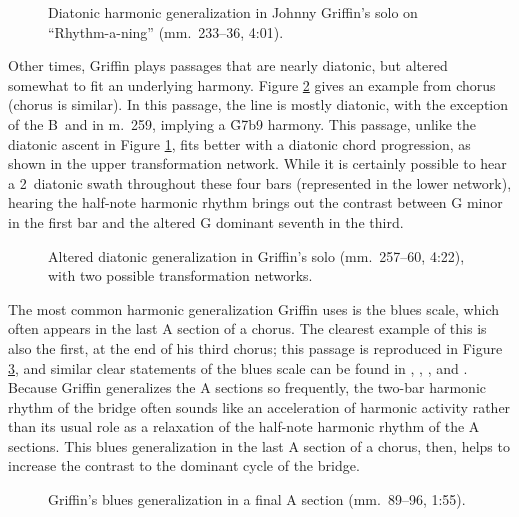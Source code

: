 \begin{figure}[tbp]
  \caption[Diatonic harmonic generalization in Johnny Griffin's solo on
    ``Rhythm-a-ning.'']{Diatonic harmonic generalization in Johnny Griffin's
    solo on ``Rhythm-a-ning'' (mm.~233--36, 4:01).}
  \label{ran:jg-diatonic-gen}
\end{figure}

Other times, Griffin plays passages that are nearly diatonic, but altered
somewhat to fit an underlying harmony. Figure \ref{ran:jg-diatonic-alt} gives
an example from chorus  (chorus  is similar). In this
passage, the line is mostly diatonic, with the exception of the B\nat\ and
\Aflat in m.~259, implying a \h{G7b9} harmony. This passage, unlike the
diatonic ascent in Figure \ref{ran:jg-diatonic-gen}, fits better with a
diatonic chord progression, as shown in the upper transformation network.
While it is certainly possible to hear a 2\flat\ diatonic swath throughout
these four bars (represented in the lower network), hearing the half-note harmonic rhythm
brings out the contrast between G minor in the first bar and the altered
G dominant seventh in the third.

\begin{figure}[tbp]
  \caption[Altered diatonic generalization Griffin's solo.]{%
    Altered diatonic generalization in Griffin's solo (mm.~257--60,
    4:22), with two possible transformation networks.}
  \label{ran:jg-diatonic-alt}
\end{figure}

The most common harmonic generalization Griffin uses is the \Bflat blues
scale, which often appears in the last A section of a chorus. The clearest
example of this is also the first, at the end of his third chorus; this
passage is reproduced in Figure \ref{ran:jg-blues-gen}, and similar clear
statements of the blues scale can be found in , ,
, and . Because Griffin generalizes the A sections so
frequently, the two-bar harmonic rhythm of the bridge often sounds like an
acceleration of harmonic activity rather than its usual role as a relaxation
of the half-note harmonic rhythm of the A sections. This blues generalization
in the last A section of a chorus, then, helps to increase the contrast to the
dominant cycle of the bridge.


\begin{figure}[tbp]
  \caption[Griffin's blues generalization in a final A section.]{%
    Griffin's blues generalization in a final A section (mm.~89--96, 1:55).}
  \label{ran:jg-blues-gen}
\end{figure}

